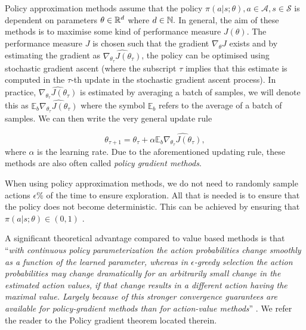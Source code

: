 Policy approximation methods assume that the policy $\pi(a|s;\theta), a \in \mathcal{A}, s \in \mathcal{S}$ is dependent on parameters $\theta \in \mathbb{R}^d$ where $d \in \mathbb{N}.$ In general, the aim of these methods is to maximise some kind of performance measure $J(\theta)$. The performance measure $J$ is chosen such that the gradient $\nabla_{\theta}J$ exists and by estimating the gradient as $\widehat{\nabla_{\theta_{\tau}} J(\theta_{\tau})}$, the policy can be optimised using stochastic gradient ascent (where the subscript $\tau$ implies that this estimate is computed in the $\tau$-th update in the stochastic gradient ascent process). In practice, $\widehat{\nabla_{\theta_{\tau}} J(\theta_{\tau})}$ is estimated by averaging a batch of samples, we will denote this as $\mathbb{E}_b \widehat{\nabla_{\theta_{\tau}} J(\theta_{\tau})}$ where the symbol $\mathbb{E}_b$ refers to the average of a batch of samples. We can then write the very general update rule

%
\begin{equation*}
\label{eq:policy_approximation_updating_rule}
\theta_{\tau+1}=\theta_{\tau}+\alpha \mathbb{E}_b\widehat{\nabla_{\theta_{\tau}} J(\theta_{\tau})},
\end{equation*}
where $\alpha$ is the learning rate.
Due to the aforementioned updating rule, these methods are also often called \textit{policy gradient methods}. 

\begin{rem} 
When using policy approximation methods, we do not need to randomly sample actions $\epsilon \%$ of the time to ensure exploration. All that is needed is to ensure that the policy does not become deterministic. This can be achieved by ensuring that $\pi(a|s;\theta) \in (0,1)$ \cite[Section 13.1]{sutton2018reinforcement}.
\end{rem}

A significant theoretical advantage compared to value based methods is that “\textit{with continuous policy parameterization the action probabilities change smoothly as a function of the learned parameter, whereas in $\epsilon$-greedy selection the action probabilities may change dramatically for an arbitrarily small change in the estimated action values, if that change results in a different action having the maximal value. Largely because of this stronger convergence guarantees are available for policy-gradient methods than for action-value methods}” \cite[Section 13.2]{sutton2018reinforcement}. We refer the reader to the Policy gradient theorem located therein.


